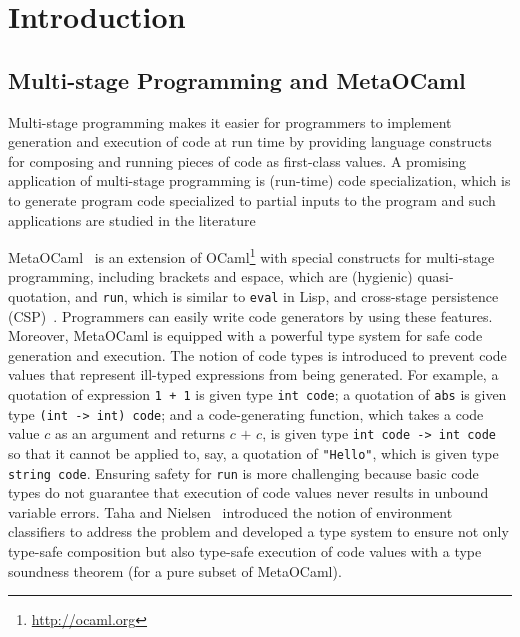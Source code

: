 
\section{Introduction}

\subsection{Multi-stage Programming and MetaOCaml}

Multi-stage programming makes it easier for programmers to implement
generation and execution of code at run time by providing language
constructs for composing and running pieces of code as first-class
values.  A promising application of multi-stage programming is
(run-time) code specialization, which is to generate program code
specialized to partial inputs to the program and such applications are
studied in the literature~\cite{taha2007gentle}  

MetaOCaml~\cite{calcagno2003implementing,oleg2014} is an extension of
OCaml\footnote{\url{http://ocaml.org}} with special constructs for
multi-stage programming, including brackets and espace, which are
(hygienic) quasi-quotation, and \texttt{run}, which is similar to
\texttt{eval} in Lisp, and cross-stage persistence
(CSP)~\cite{MetaML}.  Programmers can easily write code generators by
using these features.  Moreover, MetaOCaml is equipped with a powerful
type system for safe code generation and execution.  The notion of
code types is introduced to prevent code values that represent
ill-typed expressions from being generated.  For example, a quotation
of expression \texttt{1 + 1} is given type \texttt{int code}; a
quotation of \texttt{abs} is given type \texttt{(int -> int) code};
and a code-generating function, which takes a code value \(c\) as an
argument and returns \(c \texttt{ + } c\), is given type \texttt{int
  code -> int code} so that it cannot be applied to, say, a quotation
of \texttt{"Hello"}, which is given type \texttt{string
  code}.  Ensuring safety for \verb|run| is more challenging because
basic code types do not guarantee that execution of code values never
results in unbound variable errors.  Taha and
Nielsen~\cite{taha2003environment} introduced the notion of
environment classifiers to address the problem and developed a type
system to ensure not only type-safe composition but also type-safe
execution of code values with a type soundness theorem (for a pure
subset of MetaOCaml).


